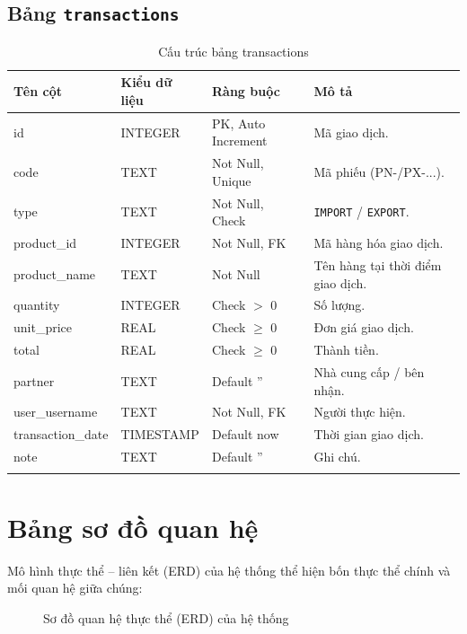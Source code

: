 \documentclass[12pt,a4paper]{report}
\begin{document}
\subsection{Bảng \texttt{transactions}}
\begin{longtable}{|L{3.2cm}|L{2.6cm}|L{3.2cm}|L{4cm}|}
\hline
\textbf{Tên cột} & \textbf{Kiểu dữ liệu} & \textbf{Ràng buộc} & \textbf{Mô tả} \\ \hline
\endhead
id & INTEGER & PK, Auto Increment & Mã giao dịch. \\ \hline
code & TEXT & Not Null, Unique & Mã phiếu (PN-/PX-...). \\ \hline
type & TEXT & Not Null, Check & \texttt{IMPORT} / \texttt{EXPORT}. \\ \hline
product\_id & INTEGER & Not Null, FK & Mã hàng hóa giao dịch. \\ \hline
product\_name & TEXT & Not Null & Tên hàng tại thời điểm giao dịch. \\ \hline
quantity & INTEGER & Check $>$ 0 & Số lượng. \\ \hline
unit\_price & REAL & Check $\geq$ 0 & Đơn giá giao dịch. \\ \hline
total & REAL & Check $\geq$ 0 & Thành tiền. \\ \hline
partner & TEXT & Default '' & Nhà cung cấp / bên nhận. \\ \hline
user\_username & TEXT & Not Null, FK & Người thực hiện. \\ \hline
transaction\_date & TIMESTAMP & Default now & Thời gian giao dịch. \\ \hline
note & TEXT & Default '' & Ghi chú. \\ \hline
\caption{Cấu trúc bảng transactions}
\end{longtable}

\section{Bảng sơ đồ quan hệ}

Mô hình thực thể -- liên kết (ERD) của hệ thống thể hiện bốn thực thể chính và
mối quan hệ giữa chúng:

\begin{figure}[H]
\centering
{}
\caption{Sơ đồ quan hệ thực thể (ERD) của hệ thống}
\label{fig:erd}
\end{figure}
\end{document}
